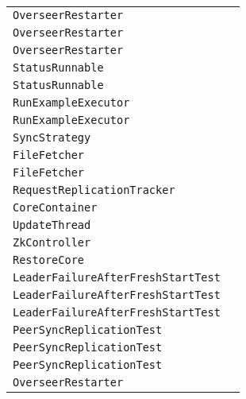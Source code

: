 \begin{center}
\begin{tabular}{ll}
\lstinline/OverseerRestarter/&\raisebox{0pt}{\lstinline/run()/}\\
\lstinline/OverseerRestarter/&\raisebox{0pt}{\lstinline/run()/}\\
\lstinline/OverseerRestarter/&\raisebox{0pt}{\lstinline/run()/}\\
\lstinline/StatusRunnable/&\raisebox{0pt}{\lstinline/sendBootstrapCommand())/}\\
\lstinline/StatusRunnable/&\raisebox{0pt}{\lstinline/sendBootstrapCommand())/}\\
\lstinline/RunExampleExecutor/&\raisebox{0pt}{\lstinline/close())/}\\
\lstinline/RunExampleExecutor/&\raisebox{0pt}{\lstinline/close())/}\\
\lstinline/SyncStrategy/&\raisebox{0pt}{\lstinline/requestRecoveries()/}\\
\lstinline/FileFetcher/&\raisebox{0pt}{\lstinline/cleanup()/}\\
\lstinline/FileFetcher/&\raisebox{0pt}{\lstinline/cleanup()/}\\
\lstinline/RequestReplicationTracker/&\raisebox{0pt}{\lstinline/doLocalCommit(CommitUpdateCommand))/}\\
\lstinline/CoreContainer/&\raisebox{0pt}{\lstinline/swap(Stringn0,Stringn1)/}\\
\lstinline/UpdateThread/&\raisebox{0pt}{\lstinline/run()/}\\
\lstinline/ZkController/&\raisebox{0pt}{\lstinline/publishNodeAsDown(StringnodeName)/}\\
\lstinline/RestoreCore/&\raisebox{0pt}{\lstinline/booleandoRestore()/}\\
\lstinline/LeaderFailureAfterFreshStartTest/&\raisebox{0pt}{\lstinline/waitForNewLeader(CloudSolrClient,String)/}\\
\lstinline/LeaderFailureAfterFreshStartTest/&\raisebox{0pt}{\lstinline/waitForNewLeader(CloudSolrClient,String)/}\\
\lstinline/LeaderFailureAfterFreshStartTest/&\raisebox{0pt}{\lstinline/waitForNewLeader(CloudSolrClient,String)/}\\
\lstinline/PeerSyncReplicationTest/&\raisebox{0pt}{\lstinline/()/}\\
\lstinline/PeerSyncReplicationTest/&\raisebox{0pt}{\lstinline/()/}\\
\lstinline/PeerSyncReplicationTest/&\raisebox{0pt}{\lstinline/()/}\\
\lstinline/OverseerRestarter/&\raisebox{0pt}{\lstinline/run()/}\\

\end{tabular}
\end{center}
